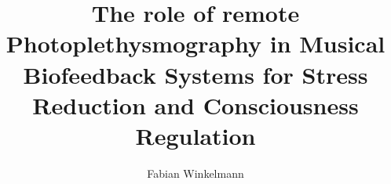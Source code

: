 \documentclass[10pt,journal,compsoc]{IEEEtran}
\begin{document}
%
\title{The role of remote Photoplethysmography in Musical Biofeedback Systems for Stress Reduction and Consciousness Regulation}
%
%
%
%

\author{Fabian Winkelmann}

% 
%
\end{document}
